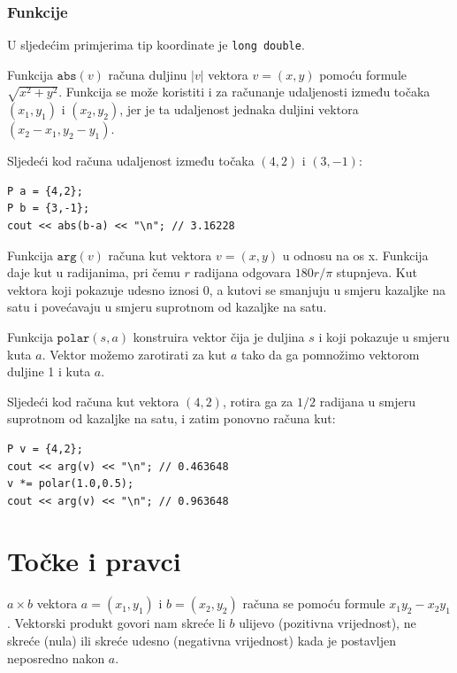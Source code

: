 \subsubsection*{Funkcije}

U sljedećim primjerima tip koordinate je
\texttt{long double}.

Funkcija $\texttt{abs}(v)$ računa duljinu
$|v|$ vektora $v=(x,y)$
pomoću formule $\sqrt{x^2+y^2}$.
Funkcija se može koristiti i za
računanje udaljenosti između točaka
$(x_1,y_1)$ i $(x_2,y_2)$,
jer je ta udaljenost jednaka duljini
vektora $(x_2-x_1,y_2-y_1)$.

Sljedeći kod računa udaljenost
između točaka $(4,2)$ i $(3,-1)$:
\begin{lstlisting}
P a = {4,2};
P b = {3,-1};
cout << abs(b-a) << "\n"; // 3.16228
\end{lstlisting}

Funkcija $\texttt{arg}(v)$ računa
kut vektora $v=(x,y)$ u odnosu na os x.
Funkcija daje kut u radijanima,
pri čemu $r$ radijana odgovara $180 r/\pi$ stupnjeva.
Kut vektora koji pokazuje udesno iznosi 0,
a kutovi se smanjuju u smjeru kazaljke na satu i povećavaju
u smjeru suprotnom od kazaljke na satu.

Funkcija $\texttt{polar}(s,a)$ konstruira vektor
čija je duljina $s$ i koji pokazuje u smjeru kuta $a$.
Vektor možemo zarotirati za kut $a$
tako da ga pomnožimo vektorom duljine 1 i kuta $a$.

Sljedeći kod računa kut
vektora $(4,2)$, rotira ga za $1/2$ radijana
u smjeru suprotnom od kazaljke na satu, i zatim ponovno računa kut:

\begin{lstlisting}
P v = {4,2};
cout << arg(v) << "\n"; // 0.463648
v *= polar(1.0,0.5);
cout << arg(v) << "\n"; // 0.963648
\end{lstlisting}

\section{Točke i pravci}


 $a \times b$ vektora
$a=(x_1,y_1)$ i $b=(x_2,y_2)$ računa se
pomoću formule $x_1 y_2 - x_2 y_1$.
Vektorski produkt govori nam skreće li $b$
ulijevo (pozitivna vrijednost), ne skreće (nula)
ili skreće udesno (negativna vrijednost)
kada je postavljen neposredno nakon $a$.

